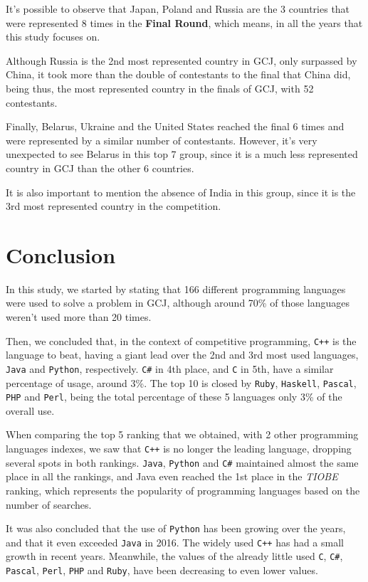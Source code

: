 \documentclass{article}
\begin{document}
\begin{multicols*}{2}
It's possible to observe that Japan, Poland and Russia are the 3 countries that were represented 8 times in the \textbf{Final Round}, which means, in all the years that this study focuses on.

Although Russia is the 2nd most represented country in GCJ, only surpassed by China, it took more than the double of contestants to the final that China did, being thus, the most represented country in the finals of GCJ, with 52 contestants.

Finally, Belarus, Ukraine and the United States reached the final 6 times and were represented by a similar number of contestants. However, it's very unexpected to see Belarus in this top 7 group, since it is a much less represented country in GCJ than the other 6 countries.

It is also important to mention the absence of India in this group, since it is the 3rd most represented country in the competition.

\section{Conclusion}

In this study, we started by stating that 166 different programming languages were used to solve a problem in GCJ, although around 70\% of those languages weren't used more than 20 times.

Then, we concluded that, in the context of competitive programming, \texttt{C++} is the language to beat, having a giant lead over the 2nd and 3rd most used languages, \texttt{Java} and \texttt{Python}, respectively. \texttt{C\#} in 4th place, and \texttt{C} in 5th, have a similar percentage of usage, around 3\%. The top 10 is closed by \texttt{Ruby}, \texttt{Haskell}, \texttt{Pascal}, \texttt{PHP} and \texttt{Perl}, being the total percentage of these 5 languages only 3\% of the overall use.

When comparing the top 5 ranking that we obtained, with 2 other programming languages indexes, we saw that \texttt{C++} is no longer the leading language, dropping several spots in both rankings. \texttt{Java}, \texttt{Python} and \texttt{C\#} maintained almost the same place in all the rankings, and Java even reached the 1st place in the \textit{TIOBE} ranking, which represents the popularity of programming languages based on the number of searches.

It was also concluded that the use of \texttt{Python} has been growing over the years, and that it even exceeded \texttt{Java} in 2016. The widely used \texttt{C++} has had a small growth in recent years. Meanwhile, the values of the already little used \texttt{C}, \texttt{C\#}, \texttt{Pascal}, \texttt{Perl}, \texttt{PHP} and \texttt{Ruby}, have been decreasing to even lower values.


\end{multicols*}
\end{document}
